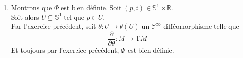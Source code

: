 \documentclass[../exercices.tex]{subfiles}
\begin{document}

	\begin{enumerate}
		\item Montrons que $\Phi$ est bien définie.
			Soit $(p, t) \in \mathbb{S}^{1} \times \mathbb{R}$. \\
			Soit alors $U \subsetneq \mathbb{S}^{1}$ tel que $p \in U$. \\
			Par l'exercice précédent, soit $\theta : U \longrightarrow \theta(U)$ un $\mathscr{C}^{\infty}$-difféomorphisme telle que
			$$
				\frac{\partial}{\partial \theta} : M \longrightarrow \mathrm{T} M
			$$
			Et toujours par l'exercice précédent, $\Phi$ est bien définie.


\end{enumerate}
\end{document}
